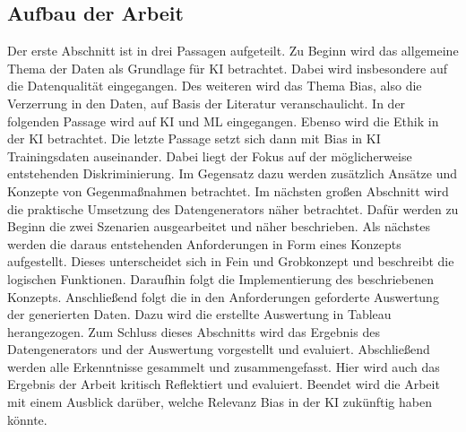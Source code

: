 \begin{onehalfspace}
        \newpage
        \section{Aufbau der Arbeit}
        \label{subsec:aufbau der arbeit}
            Der erste Abschnitt ist in drei Passagen aufgeteilt. Zu Beginn wird das allgemeine Thema der Daten als Grundlage für \ac*{KI} betrachtet. Dabei wird insbesondere auf die Datenqualität eingegangen. Des weiteren wird das Thema Bias, also die Verzerrung in den Daten, auf Basis der Literatur veranschaulicht. In der folgenden Passage wird auf \ac*{KI} und \ac*{ML} eingegangen. Ebenso wird die Ethik in der \ac*{KI} betrachtet. Die letzte Passage setzt sich dann mit Bias in \ac*{KI} Trainingsdaten auseinander. Dabei liegt der Fokus auf der möglicherweise entstehenden Diskriminierung. Im Gegensatz dazu werden zusätzlich Ansätze und Konzepte von Gegenmaßnahmen betrachtet.
            Im nächsten großen Abschnitt wird die praktische Umsetzung des Datengenerators näher betrachtet. Dafür werden zu Beginn die zwei Szenarien ausgearbeitet und näher beschrieben. Als nächstes werden die daraus entstehenden Anforderungen in Form eines Konzepts aufgestellt. Dieses unterscheidet sich in Fein und Grobkonzept und beschreibt die logischen Funktionen. Daraufhin folgt die Implementierung des beschriebenen Konzepts. Anschließend folgt die in den Anforderungen geforderte Auswertung der generierten Daten. Dazu wird die erstellte Auswertung in Tableau herangezogen. Zum Schluss dieses Abschnitts wird das Ergebnis des Datengenerators und der Auswertung vorgestellt und evaluiert.
            Abschließend werden alle Erkenntnisse gesammelt und zusammengefasst. Hier wird auch das Ergebnis der Arbeit kritisch Reflektiert und evaluiert. Beendet wird die Arbeit mit einem Ausblick darüber, welche Relevanz Bias in der \ac*{KI} zukünftig haben könnte. 
        
        \newpage
    \end{onehalfspace}
